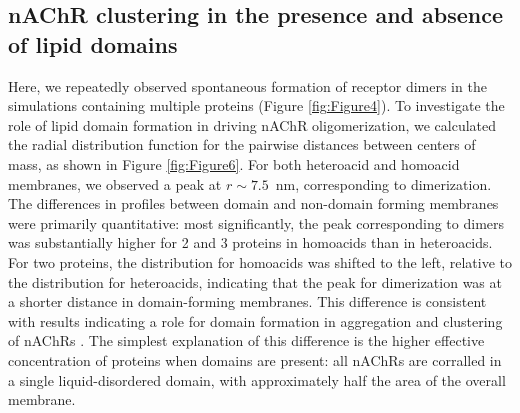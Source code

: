 \subsection{nAChR clustering in the presence and absence of lipid domains} \label{sec:clustering}
Here, we repeatedly observed spontaneous formation of receptor dimers in the simulations containing multiple proteins (Figure \ref{fig:Figure4}). 
To investigate the role of lipid domain formation in driving nAChR oligomerization, we calculated the radial distribution function for the pairwise distances between centers of mass, as shown in Figure \ref{fig:Figure6}. For both heteroacid and homoacid membranes, we observed a peak at $r\sim7.5$~nm, corresponding to dimerization.    The differences in profiles between domain and non-domain forming membranes were primarily quantitative: most significantly, the peak corresponding to dimers was substantially higher for 2 and 3 proteins in homoacids than in heteroacids. For two proteins, the distribution for homoacids was shifted to the left, relative to the distribution for heteroacids, indicating that the peak for dimerization was at a shorter distance in domain-forming membranes. This difference is consistent with results indicating a role for domain formation in aggregation and clustering of nAChRs \citep{Barrantes2007,Oshikawa2003,Pato2008}. The simplest explanation of this difference is the higher effective concentration of proteins when domains are present: all nAChRs are corralled in a single liquid-disordered domain, with approximately half the area of the overall membrane.  

